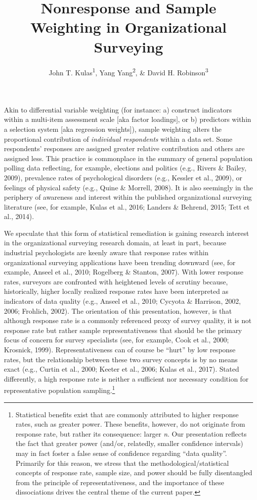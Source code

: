 \documentclass[
  man,mask]{apa7}
\title{Nonresponse and Sample Weighting in Organizational Surveying}
\author{John T. Kulas\textsuperscript{1}, Yang Yang\textsuperscript{2}, \& David H. Robinson\textsuperscript{3}}
\date{}
\affiliation{\vspace{0.5cm}\textsuperscript{1} Montclair State University\\\textsuperscript{2} Roche Group\\\textsuperscript{3} St.~Cloud State University}
\begin{document}
\maketitle

Akin to differential variable weighting (for instance: a) construct indicators within a multi-item assessment scale {[}aka factor loadings{]}, or b) predictors within a selection system {[}aka regression weights{]}), sample weighting alters the proportional contribution of \emph{individual respondents} within a data set. Some respondents' responses are assigned greater relative contribution and others are assigned less. This practice is commonplace in the summary of general population polling data reflecting, for example, elections and politics (e.g., Rivers \& Bailey, 2009), prevalence rates of psychological disorders (e.g., Kessler et al., 2009), or feelings of physical safety (e.g., Quine \& Morrell, 2008). It is also seemingly in the periphery of awareness and interest within the published organizational surveying literature (see, for example, Kulas et al., 2016; Landers \& Behrend, 2015; Tett et al., 2014).

We speculate that this form of statistical remediation is gaining research interest in the organizational surveying research domain, at least in part, because industrial psychologists are keenly aware that response rates within organizational surveying applications have been trending downward (see, for example, Anseel et al., 2010; Rogelberg \& Stanton, 2007). With lower response rates, surveyors are confronted with heightened levels of scrutiny because, historically, higher locally realized response rates have been interpreted as indicators of data quality (e.g., Anseel et al., 2010; Cycyota \& Harrison, 2002, 2006; Frohlich, 2002). The orientation of this presentation, however, is that although response rate is a commonly referenced proxy of survey quality, it is not response rate but rather sample representativeness that should be the primary focus of concern for survey specialists (see, for example, Cook et al., 2000; Krosnick, 1999). Representativeness can of course be ``hurt'' by low response rates, but the relationship between these two survey concepts is by no means exact (e.g., Curtin et al., 2000; Keeter et al., 2006; Kulas et al., 2017). Stated differently, a high response rate is neither a sufficient nor necessary condition for representative population sampling.\footnote{Statistical benefits exist that are commonly attributed to higher response rates, such as greater power. These benefits, however, do not originate from response rate, but rather its consequence: larger \emph{n}. Our presentation reflects the fact that greater power (and/or, relatedly, smaller confidence intervals) may in fact foster a false sense of confidence regarding ``data quality''. Primarily for this reason, we stress that the methodological/statistical concepts of response rate, sample size, and power should be fully disentangled from the principle of representativeness, and the importance of these dissociations drives the central theme of the current paper.}
\end{document}
